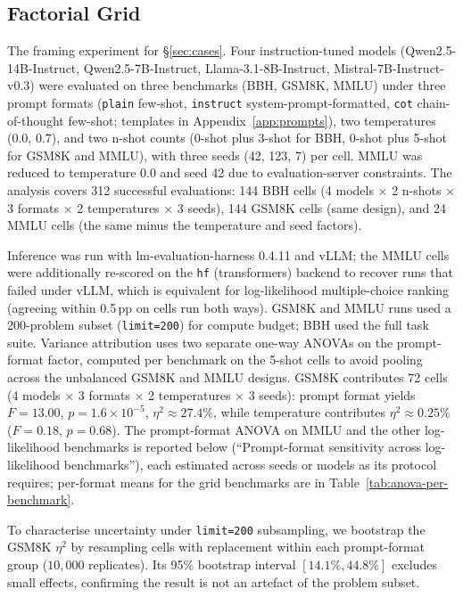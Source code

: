 \documentclass[11pt]{article}
\begin{document}
\subsection{Factorial Grid}
\label{app:exp-grid}

The framing experiment for \S\ref{sec:cases}. Four instruction-tuned
models (Qwen2.5-14B-Instruct, Qwen2.5-7B-Instruct, Llama-3.1-8B-Instruct,
Mistral-7B-Instruct-v0.3) were evaluated on three benchmarks (BBH, GSM8K,
MMLU) under three prompt formats (\texttt{plain} few-shot,
\texttt{instruct} system-prompt-formatted, \texttt{cot} chain-of-thought
few-shot; templates in Appendix~\ref{app:prompts}), two temperatures
(0.0, 0.7), and two n-shot counts (0-shot plus 3-shot for BBH, 0-shot plus
5-shot for GSM8K and MMLU), with three seeds (42, 123, 7) per cell. MMLU was
reduced to temperature 0.0 and seed 42 due to evaluation-server constraints.
The analysis covers 312 successful evaluations: 144 BBH cells (4 models
$\times$ 2 n-shots $\times$ 3 formats $\times$ 2 temperatures $\times$ 3
seeds), 144 GSM8K cells (same design), and 24 MMLU cells (the same minus the
temperature and seed factors).

Inference was run with lm-evaluation-harness 0.4.11 and vLLM; the MMLU cells
were additionally re-scored on the \texttt{hf} (transformers) backend to
recover runs that failed under vLLM, which is equivalent for log-likelihood
multiple-choice ranking (agreeing within 0.5\,pp on cells run both ways).
GSM8K and MMLU runs used a 200-problem subset (\texttt{limit=200}) for compute
budget; BBH used the full task suite. Variance attribution uses two
separate one-way ANOVAs on the prompt-format factor, computed per
benchmark on the 5-shot cells to avoid pooling across the unbalanced
GSM8K and MMLU designs. GSM8K contributes 72 cells (4 models $\times$ 3
formats $\times$ 2 temperatures $\times$ 3 seeds): prompt format yields
$F = 13.00$, $p = 1.6 \times 10^{-5}$, $\eta^2 \approx 27.4\%$, while
temperature contributes $\eta^2 \approx 0.25\%$ ($F = 0.18$, $p = 0.68$).
The prompt-format ANOVA on MMLU and the other log-likelihood benchmarks is
reported below (``Prompt-format sensitivity across log-likelihood benchmarks''),
each estimated across seeds or models as its protocol requires; per-format means
for the grid benchmarks are in Table~\ref{tab:anova-per-benchmark}.

To characterise uncertainty under \texttt{limit=200} subsampling, we bootstrap the
GSM8K $\eta^2$ by resampling cells with replacement within each prompt-format
group ($10{,}000$ replicates). Its 95\% bootstrap interval $[14.1\%, 44.8\%]$
excludes small effects, confirming the result is not an artefact of the problem
subset.
\end{document}

